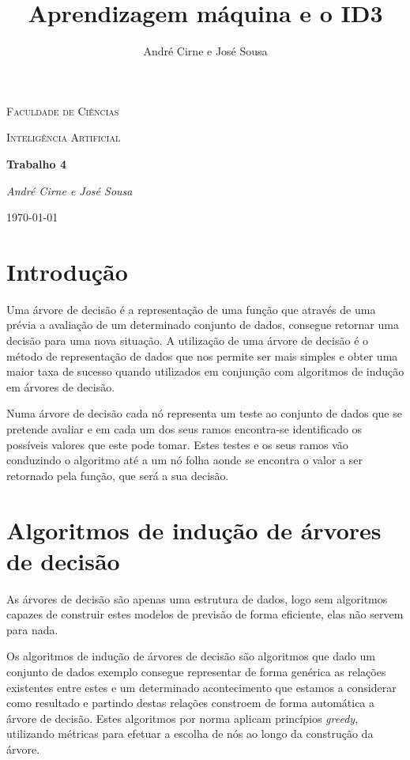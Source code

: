 \documentclass[12pt,a4paper]{article}
\author{André Cirne e José Sousa}
\title{Aprendizagem máquina e o ID3}
\begin{document}
	
\begin{titlepage}
	\centering
	{\scshape\LARGE Faculdade de Ciências \par}
	\vspace{1cm}
	{\scshape\Large Inteligência Artificial\par}
	\vspace{1.5cm}
	{\huge\bfseries Trabalho 4\par}
	\vspace{2cm}
	{\Large\itshape André Cirne e José Sousa\par}
	\vfill
	
	{\large \today\par}
\end{titlepage}

\tableofcontents

\section{Introdução}
Uma árvore de decisão é a representação de uma função que através de uma prévia a avaliação de um determinado conjunto de dados, consegue retornar uma decisão para uma nova situação\cite{stuart2016artificial}. A utilização de uma árvore de decisão é o método de representação de dados que nos permite ser mais simples e obter uma maior taxa de sucesso quando utilizados em conjunção com algoritmos de indução em árvores de decisão.

Numa árvore de decisão cada nó representa um teste ao conjunto de dados que se pretende avaliar e em cada um dos seus ramos encontra-se identificado os possíveis valores que este pode tomar. Estes testes e os seus ramos vão conduzindo o algoritmo até a um nó folha aonde se encontra o valor a ser retornado pela função, que será a sua decisão.

\section{Algoritmos de indução de árvores de decisão}
As árvores de decisão são apenas uma estrutura de dados, logo sem algoritmos capazes de construir estes modelos de previsão de forma eficiente, elas não servem para nada.

Os algoritmos de indução de árvores de decisão são algoritmos que dado um conjunto de dados exemplo consegue representar de forma genérica as relações existentes entre estes e um determinado acontecimento que estamos a considerar como resultado e partindo destas relações constroem de forma automática a árvore de decisão.\cite{rokach2005top} Estes algoritmos por norma aplicam princípios \textit{greedy}, utilizando métricas para efetuar a escolha de nós ao longo da construção da árvore.
\end{document}
